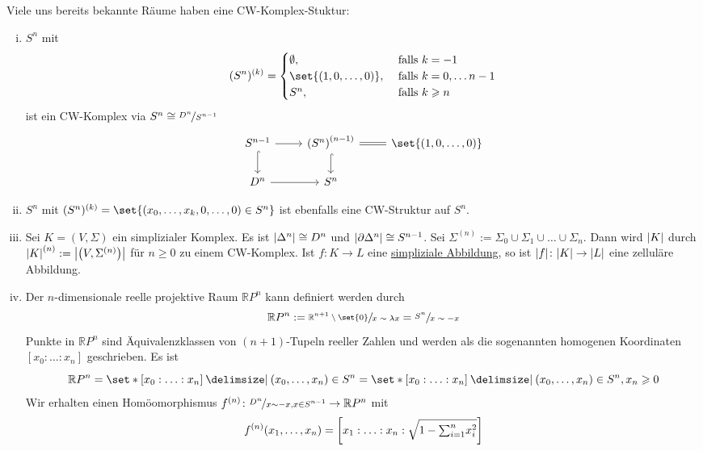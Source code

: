 \begin{beispiel}[label=bsp:115]
	Viele uns bereits bekannte Räume haben eine CW-Komplex-Stuktur:
	\begin{enumerate}[(i)]
		\item $S^n$ mit 
		\[
			(S^n)^{(k)} = \begin{cases}
				\emptyset, &\text{ falls }k=-1\\
				\set{(1,0,\ldots ,0)}, &\text{ falls } k=0, \ldots n-1 \\
				S^n , &\text{ falls } k \ge n 
			\end{cases}
		\]
		ist ein CW-Komplex via $S^n \cong \nicefrac{D^n}{S^{n-1}}$
		\[
			\begin{tikzcd}
				S^{n-1} \rar \dar[hook] & \enbrace*{S^n}^{(n-1)} \rar[equal] \dar[hook] & \set{(1,0,\ldots ,0)}   \\
				D^n \rar & S^n  
			\end{tikzcd}
		\]
		\item $S^n$ mit $(S^n)^{(k)} = \set{(x_0, \ldots ,x_k,0, \ldots ,0) \in S^n} $ ist ebenfalls eine CW-Struktur auf $S^n$.
		\item Sei $K=(V,\Sigma)$ ein simplizialer Komplex. 
		Es ist $\abs*{\Delta^n} \cong D^n$ und $\abs*{\partial \Delta^n} \cong S^{n-1}$. 
		Sei $\Sigma^{(n)} := \Sigma_0 \cup \Sigma_1 \cup \ldots \cup \Sigma_n$. 
		Dann wird $\abs*{K}$ durch $\abs*{K}^{(n)} := \abs*{\enbrace*{V,\Sigma^{(n)}}}$ für $n \ge 0$ zu einem CW-Komplex. 
		Ist $f \colon K \to L$ eine \hyperref[def:25]{simpliziale Abbildung}, so ist $\abs*{f} \colon \abs*{K} \to \abs*{L}$ eine zelluläre Abbildung.
		\item \label{enum:115:4}Der $n$-dimensionale reelle projektive Raum $\mathbb{R}P^n$ kann definiert werden durch 
		\[
			\mathbb{R}P^n := \sfrac{\mathbb{R}^{n+1} \setminus \set{0}}{x \sim \lambda x} = \sfrac{S^n}{x \sim -x}
		\]
		Punkte in $\mathbb{R}P^n$ sind Äquivalenzklassen von $(n+1)$-Tupeln reeller Zahlen und werden als die sogenannten homogenen Koordinaten $[x_0 : \ldots : x_n]$ geschrieben. Es ist 
		\[
			\mathbb{R}P^n = \set*{[x_0 : \ldots : x_n] \given (x_0, \ldots ,x_n) \in S^n \rule{0cm}{1em}} 
			= \set*{[x_0 : \ldots : x_n] \given (x_0, \ldots ,x_n) \in S^n, x_n \ge 0 \rule{0cm}{1em}}
		\]
		Wir erhalten einen Homöomorphismus $f^{(n)} \colon \nicefrac{D^n}{x \sim -x, x \in S^{n-1}} \to \mathbb{R}P^n$ mit
		\[
			f^{(n)} \enbrace*{x_1, \ldots ,x_n} = \benbrace*{x_1 : \ldots : x_n : \sqrt{1- {\textstyle\sum\nolimits_{i=1}^{n}} x_i^2}} 
\]
\end{enumerate}
\end{beispiel}
